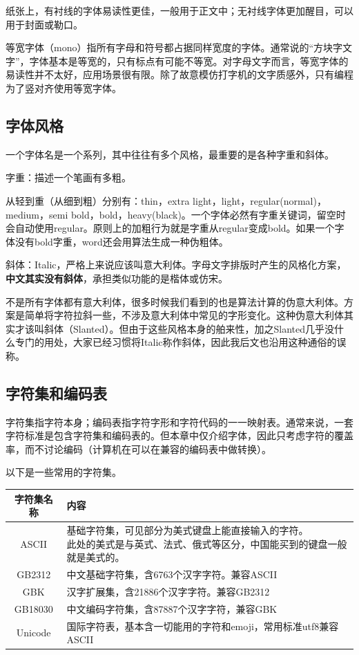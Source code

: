 \documentclass[10pt,openany]{book}
\begin{document}
纸张上，有衬线的字体易读性更佳，一般用于正文中；无衬线字体更加醒目，可以用于封面或勒口。

等宽字体（mono）指所有字母和符号都占据同样宽度的字体。通常说的“方块字文字”，字体基本是等宽的，只有标点有可能不等宽。对字母文字而言，等宽字体的易读性并不太好，应用场景很有限。除了故意模仿打字机的文字质感外，只有编程为了竖对齐使用等宽字体。

\subsection{字体风格}

一个字体名是一个系列，其中往往有多个风格，最重要的是各种字重和斜体。

字重：描述一个笔画有多粗。

从轻到重（从细到粗）分别有：thin，extra light，light，regular(normal)，medium，semi bold，bold，heavy(black)。一个字体必然有字重关键词，留空时会自动使用regular。原则上的加粗行为就是字重从regular变成bold。如果一个字体没有bold字重，word还会用算法生成一种伪粗体。

斜体：Italic，严格上来说应该叫意大利体。字母文字排版时产生的风格化方案，\textbf{中文其实没有斜体}，承担类似功能的是楷体或仿宋。

不是所有字体都有意大利体，很多时候我们看到的也是算法计算的伪意大利体。方案是简单将字符拉斜一些，不涉及意大利体中常见的字形变化。这种伪意大利体其实才该叫斜体（Slanted）。但由于这些风格本身的舶来性，加之Slanted几乎没什么专门的用处，大家已经习惯将Italic称作斜体，因此我后文也沿用这种通俗的误称。

\subsection{字符集和编码表}

字符集指字符本身；编码表指字符字形和字符代码的一一映射表。通常来说，一套字符标准是包含字符集和编码表的。但本章中仅介绍字体，因此只考虑字符的覆盖率，而不讨论编码（计算机在可以在兼容的编码表中做转换）。

以下是一些常用的字符集。

\begin{center}
    \begin{longtable}{cl}
        \textbf{字符集名称} & \textbf{内容}                            \\
        \hline
        \endfirsthead
        ASCII          & \makecell{基础字符集，可见部分为美式键盘上能直接输入的字符。    \\此处的美式是与英式、法式、俄式等区分，中国能买到的键盘一般就是美式的。}\\
        \hline
        GB2312         & 中文基础字符集，含6763个汉字字符。兼容ASCII             \\
        \hline
        GBK            & 汉字扩展集，含21886个汉字字符。兼容GB2312             \\
        \hline
        GB18030        & 中文编码字符集，含87887个汉字字符，兼容GBK              \\
        \hline
        Unicode        & 国际字符表，基本含一切能用的字符和emoji，常用标准utf8兼容ASCII \\
        \hline
    \end{longtable}
\end{center}
\end{document}
